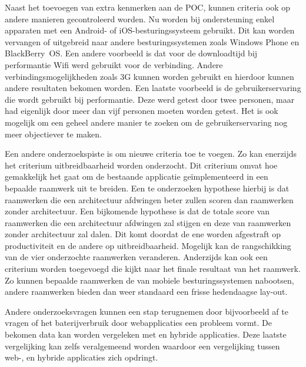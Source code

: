 Naast het toevoegen van extra kenmerken aan de POC, kunnen criteria ook op andere manieren gecontroleerd worden.
Nu worden bij ondersteuning enkel apparaten met een Android- of iOS-besturingssysteem gebruikt.
Dit kan worden vervangen of uitgebreid naar andere besturingssystemen zoals Windows Phone en BlackBerry~OS.
Een andere voorbeeld is dat voor de downloadtijd bij performantie Wifi werd gebruikt voor de verbinding.
Andere verbindingsmogelijkheden zoals 3G kunnen worden gebruikt en hierdoor kunnen andere resultaten bekomen worden.
Een laatste voorbeeld is de gebruikerservaring die wordt gebruikt bij performantie.
Deze werd getest door twee personen, maar had eigenlijk door meer dan vijf personen moeten worden getest.
Het is ook mogelijk om een geheel andere manier te zoeken om de gebruikerservaring nog meer objectiever te maken.

Een andere onderzoekspiste is om nieuwe criteria toe te voegen.
Zo kan enerzijds het criterium uitbreidbaarheid worden onderzocht.
Dit criterium omvat hoe gemakkelijk het gaat om de bestaande applicatie geïmplementeerd in een bepaalde raamwerk uit te breiden.
Een te onderzoeken hypothese hierbij is dat raamwerken die een architectuur afdwingen beter zullen scoren dan raamwerken zonder architectuur.
Een bijkomende hypothese is dat de totale score van raamwerken die een architectuur afdwingen zal stijgen en deze van raamwerken zonder architectuur zal dalen.
Dit komt doordat de ene worden afgestraft op productiviteit en de andere op uitbreidbaarheid.
Mogelijk kan de rangschikking van de vier onderzochte raamwerken veranderen.
Anderzijds kan ook een criterium worden toegevoegd die kijkt naar het finale resultaat van het raamwerk.
Zo kunnen bepaalde raamwerken de  van mobiele besturingssystemen  nabootsen, andere raamwerken bieden dan weer standaard een frisse hedendaagse lay-out.

Andere onderzoeksvragen kunnen een stap terugnemen door bijvoorbeeld af te vragen of het baterijverbruik door webapplicaties een probleem vormt.
De bekomen data kan worden vergeleken met  en hybride applicaties.
Deze laatste vergelijking kan zelfs veralgemeend worden waardoor een vergelijking tussen web-,  en hybride applicaties zich opdringt. 


